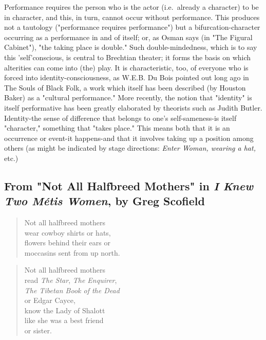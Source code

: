 \documentclass[
]{memoir}
\begin{document}
Performance requires the person who is the actor (i.e.~already a
character) to be in character, and this, in turn, cannot occur without
performance. This produces not a tautology ("performance requires
performance") but a bifurcation-character occurring as a performance in
and of itself; or, as Osman says (in "The Figural Cabinet"), "the taking
place is double." Such double-mindedness, which is to say this
'self'conscious, is central to Brechtian theater; it forms the basis on
which alterities can come into (the) play. It is characteristic, too, of
everyone who is forced into identity-consciousness, as W.E.B. Du Bois
pointed out long ago in The Souls of Black Folk, a work which itself has
been described (by Houston Baker) as a "cultural performance." More
recently, the notion that "identity" is itself performative has been
greatly elaborated by theorists such as Judith Butler. Identity-the
sense of difference that belongs to one's self-sameness-is itself
"character," something that "takes place." This means both that it is an
occurrence or event-it happens-and that it involves taking up a position
among others (as might be indicated by stage directions: \emph{Enter
Woman, wearing a hat,} etc.)

\hypertarget{from-not-all-halfbreed-mothers-in-i-knew-two-muxe9tis-women-by-greg-scofield}{%
\subsection*{\texorpdfstring{From "Not All Halfbreed Mothers" in \emph{I
Knew Two Métis Women}, by Greg
Scofield}{From "Not All Halfbreed Mothers" in I Knew Two Métis Women, by Greg Scofield}}\label{from-not-all-halfbreed-mothers-in-i-knew-two-muxe9tis-women-by-greg-scofield}}

\begin{verse}
Not all halfbreed mothers\\
wear cowboy shirts or hats,\\
flowers behind their ears or\\
moccasins sent from up north.\\
\end{verse}

\begin{verse}
Not all halfbreed mothers\\
read \emph{The Star}, \emph{The Enquirer},\\
\emph{The Tibetan Book of the Dead}\\
or Edgar Cayce,\\
know the Lady of Shalott\\
like she was a best friend\\
or sister.\\
\end{verse}
\end{document}

